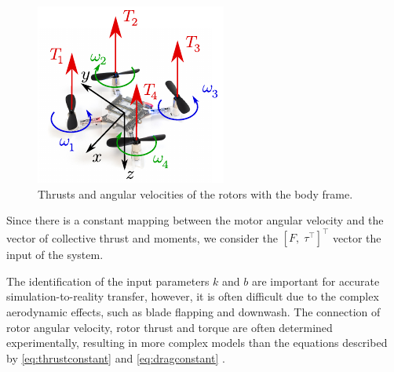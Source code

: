 \begin{figure}
\centering 
\includegraphics[width=.3\textwidth]{Fig/input_eqs.pdf}
\caption{Thrusts and angular velocities of the rotors with the body frame.}\label{fig:input_eqs}
\end{figure}


Since there is a constant mapping between the motor angular velocity and the vector of collective thrust and moments, we consider the $\left[F,\; \tau^\top\right]^\top$ vector the input of the system.

The identification of the input parameters $k$ and $b$ are important for accurate simulation-to-reality transfer, however, it is often difficult due to the complex aerodynamic effects, such as blade flapping and downwash. The connection of rotor angular velocity, rotor thrust and torque are often determined experimentally, resulting in more complex models than the equations described by \eqref{eq:thrustconstant} and \eqref{eq:dragconstant} \cite{Forster}.